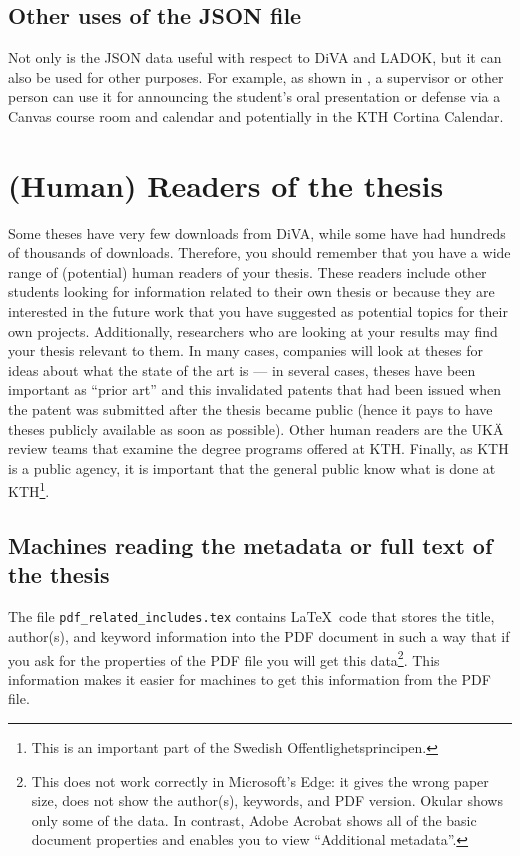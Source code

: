 \documentclass[12pt, twoside]{article}
\newcommand{\fname}[1]{\texttt{#1}}
\begin{document}
\subsection{Other uses of the JSON file}
Not only is the JSON data useful with respect to \gls{DiVA} and \gls{LADOK}, but it can also be used for other purposes. For example, as shown in , a supervisor or other person can use it for announcing the student's oral presentation or defense via a Canvas course room and calendar and potentially in the KTH Cortina Calendar.
\clearpage

\section{(Human) Readers of the thesis}
\label{sec:readers}
Some theses have very few downloads from \gls{DiVA}, while some have had hundreds of thousands of downloads. Therefore, you should remember that you have a wide range of (potential) human readers of your thesis. These readers include other students looking for information related to their own thesis or because they are interested in the future work that you have suggested as potential topics for their own projects. Additionally, researchers who are looking at your results may find your thesis relevant to them. In many cases, companies will look at theses for ideas about what the state of the art is --- in several cases, theses have been important as \enquote{prior art} and this invalidated patents that had been issued when the patent was submitted after the thesis became public (hence it pays to have theses publicly available as soon as possible). Other human readers are the \foreignlanguage{swedish}{\gls{UKÄ}} review teams that examine the degree programs offered at \gls{KTH}. Finally, as \gls{KTH} is a public agency, it is important that the general public know what is done at \gls{KTH}\footnote{This is an important part of the Swedish \foreignlanguage{swedish}{Offentlighetsprincipen}.}.


\subsection{Machines reading the metadata or full text of the thesis}
\label{sec:searchEngines}
The file \fname{pdf\_related\_includes.tex} contains \LaTeX\ code that stores the title, author(s), and keyword information into the \gls{PDF} document in such a way that if you ask for the properties of the \gls{PDF} file you will get this data\footnote{This does not work correctly in Microsoft's Edge: it gives the wrong paper size, does not show the author(s), keywords, and \gls{PDF} version. Okular shows only some of the data. In contrast, Adobe Acrobat shows all of the basic document properties and enables you to view \enquote{Additional metadata}.}. This information makes it easier for machines to get this information from the \gls{PDF} file.
\end{document}
